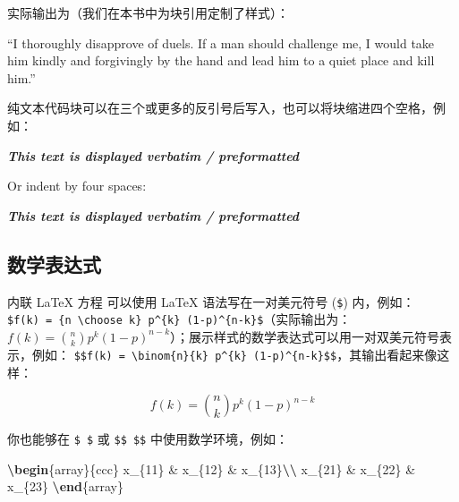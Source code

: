 \documentclass[
  12pt,
]{krantz}
\newenvironment{Shaded}{\begin{snugshade}}{\end{snugshade}}
\newcommand{\ExtensionTok}[1]{#1}
\newcommand{\InformationTok}[1]{\textcolor[rgb]{0.56,0.35,0.01}{\textbf{\textit{#1}}}}
\newcommand{\KeywordTok}[1]{\textcolor[rgb]{0.13,0.29,0.53}{\textbf{#1}}}
\newcommand{\NormalTok}[1]{#1}
\newcommand{\SpecialCharTok}[1]{\textcolor[rgb]{0.81,0.36,0.00}{\textbf{#1}}}
\newcommand{\SpecialStringTok}[1]{\textcolor[rgb]{0.31,0.60,0.02}{#1}}
\renewenvironment{quote}{\begin{VF}}{\end{VF}}
\theoremstyle{definition}
\theoremstyle{definition}
\theoremstyle{definition}
\theoremstyle{definition}
\theoremstyle{remark}
\begin{document}
实际输出为（我们在本书中为块引用定制了样式）：

\begin{quote}
``I thoroughly disapprove of duels. If a man should challenge me,
I would take him kindly and forgivingly by the hand and lead him
to a quiet place and kill him.''

\end{quote}

纯文本代码块可以在三个或更多的反引号后写入，也可以将块缩进四个空格，例如：

\begin{Shaded}
\begin{Highlighting}[]
\InformationTok{\textasciigrave{}\textasciigrave{}\textasciigrave{}}
\InformationTok{This text is displayed verbatim / preformatted}
\InformationTok{\textasciigrave{}\textasciigrave{}\textasciigrave{}}

\NormalTok{Or indent by four spaces:}

\InformationTok{    This text is displayed verbatim / preformatted}
\end{Highlighting}
\end{Shaded}

\hypertarget{ux6570ux5b66ux8868ux8fbeux5f0f}{%
\subsection{数学表达式}\label{ux6570ux5b66ux8868ux8fbeux5f0f}}

内联 LaTeX 方程 可以使用 LaTeX 语法写在一对美元符号 (\texttt{\$}) 内，例如：\texttt{\$f(k)\ =\ \{n\ \textbackslash{}choose\ k\}\ p\^{}\{k\}\ (1-p)\^{}\{n-k\}\$}（实际输出为：\(f(k)=\binom{n}{k}p^{k}(1-p)^{n-k}\)）；展示样式的数学表达式可以用一对双美元符号表示，例如： \texttt{\$\$f(k)\ =\ \textbackslash{}binom\{n\}\{k\}\ p\^{}\{k\}\ (1-p)\^{}\{n-k\}\$\$}，其输出看起来像这样：

\[f\left(k\right)=\binom{n}{k}p^k\left(1-p\right)^{n-k}\]

你也能够在 \texttt{\$\ \$} 或 \texttt{\$\$\ \$\$} 中使用数学环境，例如：

\begin{Shaded}
\begin{Highlighting}[]
\SpecialStringTok{$$}\KeywordTok{\textbackslash{}begin}\NormalTok{\{}\ExtensionTok{array}\NormalTok{\}}\SpecialStringTok{\{ccc\}}
\SpecialStringTok{x\_\{11\} \& x\_\{12\} \& x\_\{13\}}\SpecialCharTok{\textbackslash{}\textbackslash{}}
\SpecialStringTok{x\_\{21\} \& x\_\{22\} \& x\_\{23\}}
\KeywordTok{\textbackslash{}end}\NormalTok{\{}\ExtensionTok{array}\NormalTok{\}}\SpecialStringTok{$$}
\end{Highlighting}
\end{Shaded}
\end{document}
